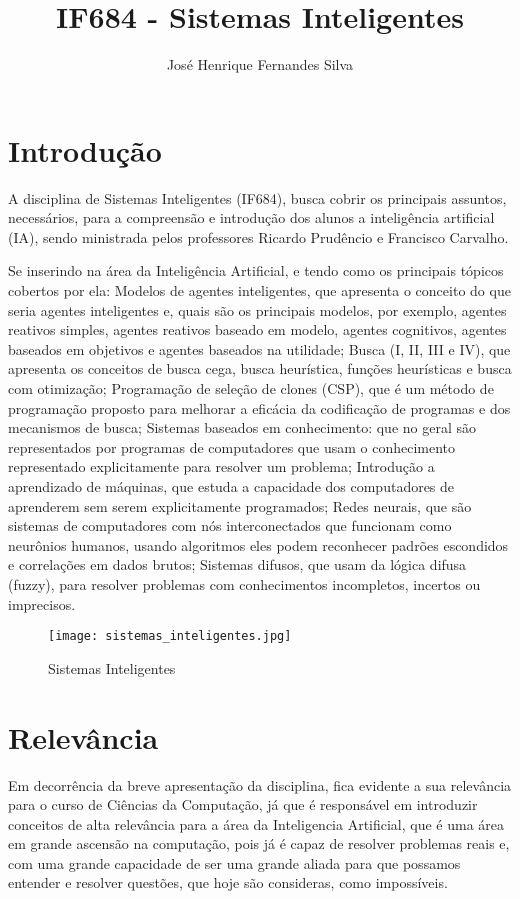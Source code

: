 \documentclass[10pt]{article}
\title{IF684 - Sistemas Inteligentes}
\author{José Henrique Fernandes Silva}
\date{\vspace{-5ex}}
\begin{document}
\maketitle

\section{Introdução}
    A disciplina de Sistemas Inteligentes (IF684), busca cobrir os principais assuntos, necessários, para a compreensão e introdução dos alunos a inteligência artificial (IA), sendo ministrada pelos professores Ricardo Prudêncio e Francisco Carvalho.
    \citep{primeira, segunda, terceira}
    
    Se inserindo na área da Inteligência Artificial, e tendo como os principais tópicos cobertos por ela: Modelos de agentes inteligentes, que apresenta o conceito do que seria agentes inteligentes e, quais são os principais modelos, por exemplo, agentes reativos simples, agentes reativos baseado em modelo, agentes cognitivos, agentes baseados em objetivos e agentes baseados na utilidade; Busca (I, II, III e IV), que apresenta os conceitos de busca cega, busca heurística, funções heurísticas e busca com otimização; Programação de seleção de clones (CSP), que é um método de programação proposto para melhorar a eficácia da codificação de programas e dos mecanismos de busca; Sistemas baseados em conhecimento: que no geral são representados por programas de computadores que usam o conhecimento representado explicitamente para resolver um problema; Introdução a aprendizado de máquinas, que estuda a capacidade dos computadores de aprenderem sem serem explicitamente programados; Redes neurais, que são sistemas de computadores com nós interconectados que funcionam como neurônios humanos, usando algoritmos eles podem reconhecer padrões escondidos e correlações em dados brutos; Sistemas difusos, que usam da lógica difusa (fuzzy), para resolver problemas com conhecimentos incompletos, incertos ou imprecisos.
    \cite{primeira, quarta, quinta, sexta, setima, oitava, nona}
    
    \begin{figure}[H]
        \centering
        \texttt{[image: sistemas\_inteligentes.jpg]}
        \caption{Sistemas Inteligentes \cite{imagem}}
        \label{sistemas_inteligentes}
    \end{figure}
    

\section{Relevância}
    Em decorrência da breve apresentação da disciplina, fica evidente a sua relevância para o curso de Ciências da Computação, já que é responsável em introduzir conceitos de alta relevância para a área da Inteligencia Artificial, que é uma área em grande ascensão na computação, pois já é capaz de resolver problemas reais e, com uma grande capacidade de ser uma grande aliada para que possamos entender e resolver questões, que hoje são consideras, como impossíveis. 
\end{document}

